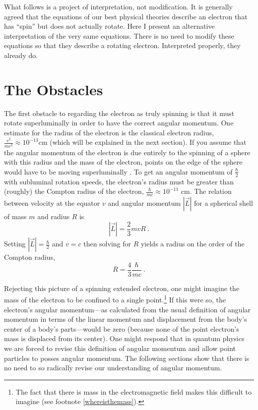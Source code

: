 \documentclass[onecolumn,secnumarabic,amsmath,amssymb,balancelastpage,nofootinbib]{article}
\begin{document}
What follows is a project of interpretation, not modification.  It is generally agreed that the equations of our best physical theories describe an electron that has ``spin'' but does not actually rotate.  Here I present an alternative interpretation of the very same equations.  There is no need to modify these equations so that they describe a rotating electron.  Interpreted properly, they already do.

\section{The Obstacles}\label{obstacles}

The first obstacle to regarding the electron as truly spinning is that it must rotate superluminally in order to have the correct angular momentum.  One estimate for the radius of the electron is the classical electron radius, $\frac{e^2}{m c^2}\approx10^{-13}\mbox{cm}$ (which will be explained in the next section).  If you assume that the angular momentum of the electron is due entirely to the spinning of a sphere with this radius and the mass of the electron, points on the edge of the sphere would have to be moving superluminally \citep[problem 4.25]{griffithsQM}.  To get an angular momentum of $\frac{\hbar}{2}$ with subluminal rotation speeds, the electron's radius must be greater than (roughly) the Compton radius of the electron, $\frac{\hbar}{m c}\approx10^{-11}\mbox{ cm}$.  The relation between velocity at the equator $v$ and angular momentum $|\vec{L}|$ for a spherical shell of mass $m$ and radius $R$ is
\begin{equation}
|\vec{L}| = \frac{2}{3}m v R\ .
\end{equation}
Setting $|\vec{L}| = \frac{\hbar}{2}$ and $v=c$ then solving for $R$ yields a radius on the order of the Compton radius,
\begin{equation}
R=\frac{4}{3}\frac{\hbar}{m c}\ .
\end{equation}

Rejecting this picture of a spinning extended electron, one might imagine the mass of the electron to be confined to a single point.\footnote{The fact that there is mass in the electromagnetic field makes this difficult to imagine (see footnote \ref{whereisthemass}).}  If this were so, the electron's angular momentum---as calculated from the usual definition of angular momentum in terms of the linear momentum and displacement from the body's center of a body's parts---would be zero (because none of the point electron's mass is displaced from its center).  One might respond that in quantum physics we are forced to revise this definition of angular momentum and allow point particles to posses angular momentum.  The following sections show that there is no need to so radically revise our understanding of angular momentum.
\end{document}
